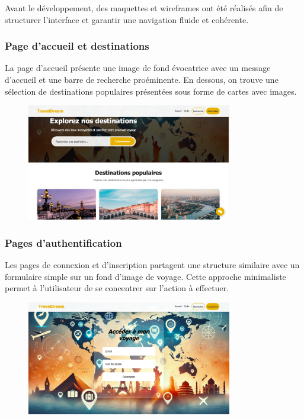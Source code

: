 \documentclass[a4paper,12pt]{article}
\begin{document}
Avant le développement, des maquettes et wireframes ont été réalisés afin de structurer l’interface et garantir une navigation fluide et cohérente.

\subsubsection{Page d'accueil et destinations}

La page d'accueil présente une image de fond évocatrice avec un message d'accueil et
une barre de recherche proéminente. En dessous, on trouve une sélection de
destinations populaires présentées sous forme de cartes avec images.
\begin{figure}[H]
    \centering
    \includegraphics[width=0.8\textwidth]{Destination.png}
\end{figure}

\vspace{0.5cm}
\subsubsection{Pages d'authentification}
Les pages de connexion et d'inscription partagent une structure similaire avec un
formulaire simple sur un fond d'image de voyage. Cette approche minimaliste permet à
l'utilisateur de se concentrer sur l'action à effectuer.
\begin{figure}[H]
    \centering
    \includegraphics[width=0.8\textwidth]{accueil.png}
\end{figure}
\end{document}
